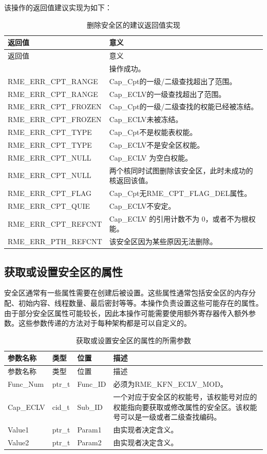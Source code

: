 该操作的返回值建议实现为如下：

\begin{xltabular}{\textwidth}{@{}>{\hsize\raggedright\arraybackslash}X>{\hsize\raggedright\arraybackslash}X@{}}
\caption{删除安全区的建议返回值实现}\label{tab:8-97-delete-enclave-suggested-return-values}\\
\toprule
返回值 & 意义\tabularnewline
\endfirsthead
\toprule
返回值 & 意义\tabularnewline
\midrule
\endhead
\bottomrule
{} & 操作成功。\tabularnewline
    RME\_ERR\_CPT\_RANGE & Cap\_Cpt的一级/二级查找超出了范围。\tabularnewline
    RME\_ERR\_CPT\_RANGE & Cap\_ECLV的一级查找超出了范围。\tabularnewline
    RME\_ERR\_CPT\_FROZEN & Cap\_Cpt的一级/二级查找的权能已经被冻结。\tabularnewline
    RME\_ERR\_CPT\_FROZEN & Cap\_ECLV未被冻结。\tabularnewline
    RME\_ERR\_CPT\_TYPE & Cap\_Cpt不是权能表权能。\tabularnewline
    RME\_ERR\_CPT\_TYPE & Cap\_ECLV不是安全区权能。\tabularnewline
    RME\_ERR\_CPT\_NULL & Cap\_ECLV 为空白权能。\tabularnewline
    RME\_ERR\_CPT\_NULL & 两个核同时试图删除该安全区，此时未成功的核返回该值。\tabularnewline
    RME\_ERR\_CPT\_FLAG & Cap\_Cpt无RME\_CPT\_FLAG\_DEL属性。\tabularnewline
    RME\_ERR\_CPT\_QUIE & Cap\_ECLV不安定。\tabularnewline
    RME\_ERR\_CPT\_REFCNT & Cap\_ECLV 的引用计数不为 0，或者不为根权能。\tabularnewline
    RME\_ERR\_PTH\_REFCNT & 该安全区因为某些原因无法删除。\tabularnewline
\end{xltabular}

\subsection{获取或设置安全区的属性}\label{subsec:8-get-or-set-enclave-attributes}

安全区通常有一些属性需要在创建后被设置。这些属性通常包括安全区的内存分配、初始内容、线程数量、最后密封等等。本操作负责设置这些可能存在的属性。由于部分安全区属性可能较长，因此本操作可能需要使用额外寄存器传入额外参数。这些参数传递的方法对于每种架构都是可以自定义的。

\begin{xltabular}{\textwidth}{@{}>{\hsize\raggedright\arraybackslash}X>{\hsize\raggedright\arraybackslash}X>{\hsize\raggedright\arraybackslash}X>{\hsize\raggedright\arraybackslash}X@{}}
\caption{获取或设置安全区的属性的所需参数}\label{tab:8-98-get-or-set-enclave-attributes-parameters}\\
\toprule
参数名称 & 类型 & 位置 & 描述\tabularnewline
\endfirsthead
\toprule
参数名称 & 类型 & 位置 & 描述\tabularnewline
\midrule
\endhead
\bottomrule
\endlastfoot
Func\_Num & ptr\_t & Func\_ID &
必须为RME\_KFN\_ECLV\_MOD。\tabularnewline
Cap\_ECLV & cid\_t & Sub\_ID &
一个对应于安全区的权能号，该权能号对应的权能指向要获取或修改属性的安全区。该权能号可以是一级或者二级查找编码。\tabularnewline
Value1 & ptr\_t & Param1 & 由实现者决定含义。\tabularnewline
Value2 & ptr\_t & Param2 & 由实现者决定含义。\tabularnewline
\end{xltabular}

